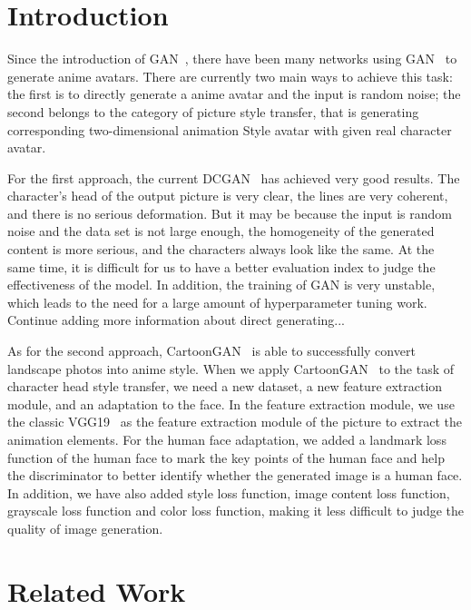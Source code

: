 \documentclass[10pt,twocolumn,letterpaper]{article}
\begin{document}
\section{Introduction}

Since the introduction of GAN~\cite{GAN},
there have been many networks using GAN~\cite{GAN} to generate anime avatars. There are currently
two main ways to achieve this task: the first is to directly generate a anime avatar
and the input is random noise; the second belongs to the category of picture style
transfer, that is generating corresponding two-dimensional animation Style avatar with given real
character avatar.

For the first approach, the current DCGAN~\cite{DCGAN} has achieved very good results.
The character's head of the output picture is very clear, the lines are very coherent, and there
is no serious deformation. But it may be because the input is random noise and the data
set is not large enough, the homogeneity of the generated content is more serious, and the
characters always look like the same. At the same time, it is difficult for us to have a better
evaluation index to judge the effectiveness of the model. In addition, the training of GAN
is very unstable, which leads to the need for a large amount of hyperparameter tuning work.
{\color{red}Continue adding more information about direct generating...}

As for the second approach, CartoonGAN~\cite{CartoonGAN} is able to successfully convert landscape photos
into anime style. When we apply CartoonGAN~\cite{CartoonGAN} to the task of character head style transfer,
we need a new dataset, a new feature extraction module, and an adaptation to the face.
In the feature extraction module, we use the classic VGG19~\cite{VGG} as the feature extraction
module of the picture to extract the animation elements. For the human face adaptation,
we added a landmark loss function of the human face to mark the key points of the human face and
help the discriminator to better identify whether the generated image is a human face. In addition,
we have also added style loss function, image content loss function,
grayscale loss function and color loss function, making it less difficult to
judge the quality of image generation.

\section{Related Work}
\end{document}
